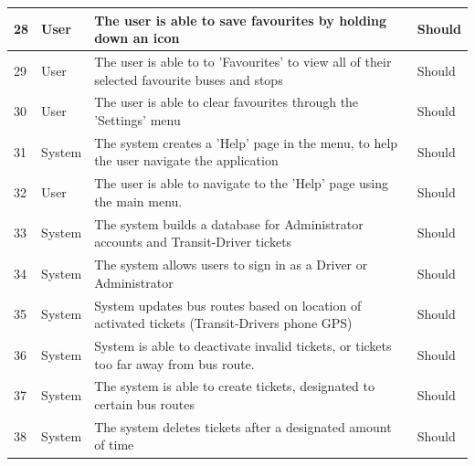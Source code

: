 \documentclass[a4paper,12pt]{article}
\begin{document}
\begin{tabular}{p{0.4cm}|p{2cm}|p{8cm}|p{1.7cm}}

28 & User & The user is able to save favourites by holding down an icon & Should \\
\hline
29 & User & The user is able to to 'Favourites' to view all of their selected favourite buses and stops & Should \\
\hline
30 & User & The user is able to clear favourites through the 'Settings' menu & Should \\
\hline
31 & System & The system creates a 'Help' page in the menu, to help the user navigate the application & Should \\
\hline
32 & User & The user is able to navigate to the 'Help' page using the main menu. & Should \\
\hline
33 & System & The system builds a database for Administrator accounts and Transit-Driver tickets & Should \\
\hline
34 & System & The system allows users to sign in as a Driver or Administrator & Should \\
\hline
35 & System & System updates bus routes based on location of activated tickets (Transit-Drivers phone GPS) & Should \\
\hline
36 & System & System is able to deactivate invalid tickets, or tickets too far away from bus route. & Should\\
\hline
37 & System & The system is able to create tickets, designated to certain bus routes & Should \\
\hline
38 & System & The system deletes tickets after a designated amount of time & Should \\
\hline

\end{tabular}

\pagebreak
\end{document}

